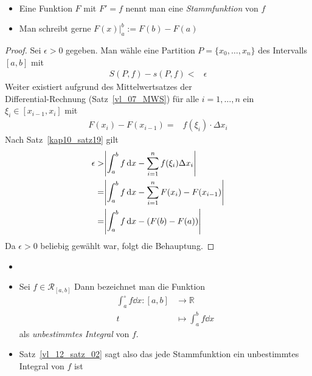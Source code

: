\begin{Bemerkung}{
	~\begin{itemize}
		\item Eine Funktion $F$ mit $F'=f$ nennt man eine \emph{Stammfunktion} 
		von $f$
		\item Man schreibt gerne $F(x) \vert_a^b := F(b) -F(a)$
	\end{itemize}
}\end{Bemerkung}

\begin{proof}
	Sei $\epsilon >0 $ gegeben. Man wähle eine Partition $P = \{x_0, \hdots, x_n\}$ 
	des Intervalls $[a,b]$ mit 
	\begin{align*}
		S(P,f) - s(P,f) < & \epsilon
	\end{align*}
	Weiter existiert aufgrund des Mittelwertsatzes der \\Differential-Rechnung
	(Satz~\ref{vl_07_MWS}) für alle $i = 1, \hdots, n$ ein $ \xi_i \in 
	[x_{i-1},x_i]$ mit 
	\begin{align*}
		F(x_i) - F(x_{i-1}) = &  f(\xi_i) \cdot \Delta x_i
	\end{align*}
	Nach Satz~\ref{kap10_satz19} gilt 
	\begin{align*}
		\epsilon > & \abs{ \int_a^b f \dd{x} - \sum_{i=1}^n f(\xi_i) \Delta x_i} \\
		= & \abs{ \int_a^b f \dd{x} - \sum_{i=1}^n F(x_i) -F(x_{i-1})} \\
		= & \abs{ \int_a^b f \dd{x} - (F(b) -F(a))}
	\end{align*}
	Da $\epsilon > 0$ beliebig gewählt war, folgt die Behauptung.	
\end{proof}

\begin{Bemerkung}{
	\begin{itemize}
	\item[ ]
		\item Sei $f \in \mathcal{R}_{[a,b]}$ Dann bezeichnet man die Funktion 
		\begin{align*}
			\int_a^{\circ} f\dd{x} :  [a,b]  & \rightarrow \mathbb{R} \\
			 t & \mapsto \int_a^b f\dd{x}
		\end{align*}
		als \emph{unbestimmtes Integral} von $f$.
		\item Satz~\ref{vl_12_satz_02}
		sagt also das jede Stammfunktion ein unbestimmtes Integral von $f$ ist 
	\end{itemize}
}\end{Bemerkung}

